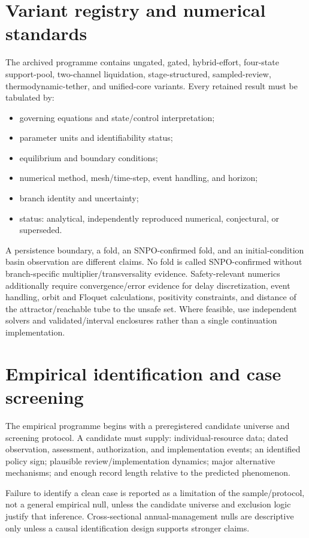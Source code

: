 \documentclass[11pt]{article}
\begin{document}
\section{Variant registry and numerical standards}
The archived programme contains ungated, gated, hybrid-effort, four-state support-pool, two-channel liquidation, stage-structured, sampled-review, thermodynamic-tether, and unified-core variants. Every retained result must be tabulated by:
\begin{itemize}
\item governing equations and state/control interpretation;
\item parameter units and identifiability status;
\item equilibrium and boundary conditions;
\item numerical method, mesh/time-step, event handling, and horizon;
\item branch identity and uncertainty;
\item status: analytical, independently reproduced numerical, conjectural, or superseded.
\end{itemize}
A persistence boundary, a fold, an SNPO-confirmed fold, and an initial-condition basin observation are different claims. No fold is called SNPO-confirmed without branch-specific multiplier/transversality evidence. Safety-relevant numerics additionally require convergence/error evidence for delay discretization, event handling, orbit and Floquet calculations, positivity constraints, and distance of the attractor/reachable tube to the unsafe set. Where feasible, use independent solvers and validated/interval enclosures rather than a single continuation implementation.

\section{Empirical identification and case screening}
The empirical programme begins with a preregistered candidate universe and screening protocol. A candidate must supply: individual-resource data; dated observation, assessment, authorization, and implementation events; an identified policy sign; plausible review/implementation dynamics; major alternative mechanisms; and enough record length relative to the predicted phenomenon.

Failure to identify a clean case is reported as a limitation of the sample/protocol, not a general empirical null, unless the candidate universe and exclusion logic justify that inference. Cross-sectional annual-management nulls are descriptive only unless a causal identification design supports stronger claims.
\end{document}
